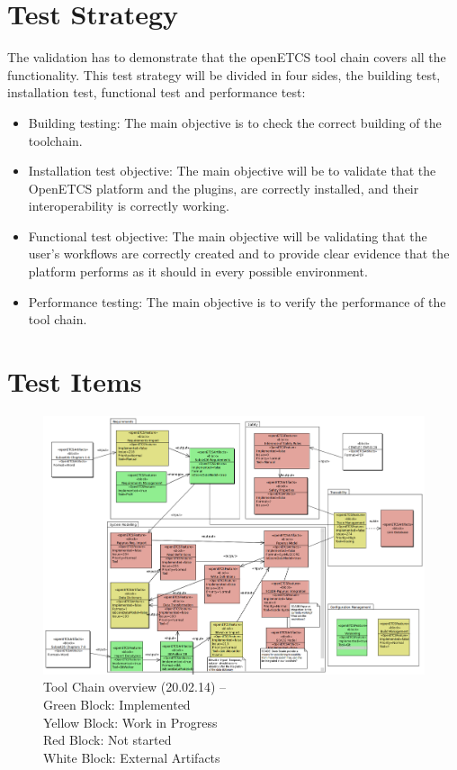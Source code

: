 \section{Test Strategy}
\label{sec:test_stra}

The validation has to demonstrate that the openETCS tool chain covers all the functionality. This test strategy will be divided in four sides, the building test, installation test, functional test and performance test:
\begin{itemize}
\item Building testing: The main objective is to check the correct building of the toolchain.
\item Installation test objective: The main objective will be to validate that the OpenETCS platform and the plugins, are correctly installed, and their interoperability is correctly working.
\item Functional test objective: The main objective will be validating that the user’s workflows are correctly created and to provide clear evidence that the platform performs as it should in every possible environment.
\item Performance testing: The main objective is to verify the performance of the tool chain.
\end{itemize}

\section{Test Items}
\label{sec:test_items}


\begin{figure}[htbp]
\includegraphics[width=\textwidth]{ToolChainmodel}
\caption{\label{fig:overview} Tool Chain overview (20.02.14) -- \\
  Green Block: Implemented \\
  Yellow Block: Work in Progress \\
  Red Block: Not started \\
  White Block: External Artifacts} 
\end{figure}

